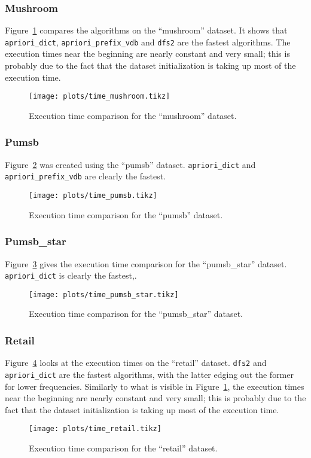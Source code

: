 \documentclass[journal, 9pt]{IEEEtran}
\theoremstyle{definition}
\newcommand{\py}[1]{\texttt{#1}}
\begin{document}
\subsubsection{Mushroom}
Figure~\ref{fig:time_mushroom} compares the algorithms on the ``mushroom'' dataset.
It shows that \py{apriori_dict}, \py{apriori_prefix_vdb} and \py{dfs2} are the fastest algorithms.
The execution times near the beginning are nearly constant and very small; this is probably due to the fact that the dataset initialization is taking up most of the execution time.
\begin{figure}[!hbtp]
	\centering
	\texttt{[image: plots/time\_mushroom.tikz]}
	\caption{Execution time comparison for the ``mushroom'' dataset.}
	\label{fig:time_mushroom}
\end{figure}

\subsubsection{Pumsb}
Figure~\ref{fig:time_pumsb} was created using the ``pumsb'' dataset.
\py{apriori_dict} and \py{apriori_prefix_vdb} are clearly the fastest.
\begin{figure}[!hbtp]
	\centering
	\texttt{[image: plots/time\_pumsb.tikz]}
	\caption{Execution time comparison for the ``pumsb'' dataset.}
	\label{fig:time_pumsb}
\end{figure}

\subsubsection{Pumsb\_star}
Figure~\ref{fig:time_pumsb_star} gives the execution time comparison for the ``pumsb\_star'' dataset.
\py{apriori_dict} is clearly the fastest,.
\begin{figure}[!hbtp]
	\centering
	\texttt{[image: plots/time\_pumsb\_star.tikz]}
	\caption{Execution time comparison for the ``pumsb\_star'' dataset.}
	\label{fig:time_pumsb_star}
\end{figure}

\subsubsection{Retail}
Figure~\ref{fig:time_retail} looks at the execution times on the ``retail'' dataset.
\py{dfs2} and \py{apriori_dict} are the fastest algorithms, with the latter edging out the former for lower frequencies.
Similarly to what is visible in Figure~\ref{fig:time_mushroom}, the execution times near the beginning are nearly constant and very small; this is probably due to the fact that the dataset initialization is taking up most of the execution time.
\begin{figure}[!hbtp]
	\centering
	\texttt{[image: plots/time\_retail.tikz]}
	\caption{Execution time comparison for the ``retail'' dataset.}
	\label{fig:time_retail}
\end{figure}
\end{document}
